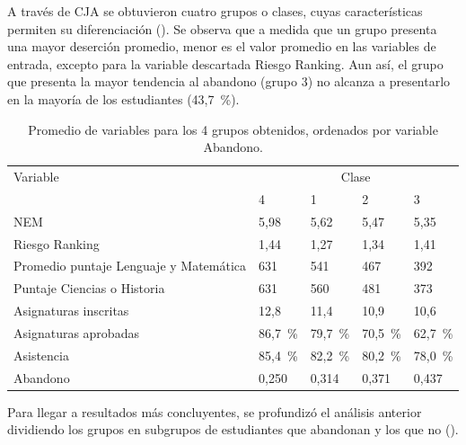 \documentclass[portuguese]{textolivre}
\begin{document}
A través de CJA se obtuvieron cuatro grupos o clases, cuyas características permiten su diferenciación (). Se observa que a medida que un grupo presenta una mayor deserción promedio, menor es el valor promedio en las variables de entrada, excepto para la variable descartada Riesgo Ranking. Aun así, el grupo que presenta la mayor tendencia al abandono (grupo 3) no alcanza a presentarlo en la mayoría de los estudiantes (43,7~\%).

\begin{table}[htbp]
    \caption{Promedio de variables para los 4 grupos obtenidos, ordenados por variable Abandono.}
    \label{Tabla 5}
    \centering
    \begin{tabular}{lllll}
    \toprule
    Variable &
    \multicolumn{4}{c}{Clase}\\
    & 4 & 1 & 2 & 3\\
    \midrule
    NEM & 5,98 & 5,62 & 5,47 & 5,35\\
    Riesgo Ranking & 1,44 & 1,27 & 1,34 & 1,41\\
    Promedio puntaje Lenguaje y Matemática & 631 & 541 & 467 & 392\\
    Puntaje Ciencias o Historia & 631 & 560 & 481 & 373\\
    Asignaturas inscritas & 12,8 & 11,4 & 10,9 & 10,6\\
    Asignaturas aprobadas & 86,7~\% & 79,7~\% & 70,5~\% & 62,7~\%\\
    Asistencia & 85,4~\% & 82,2~\% & 80,2~\% & 78,0~\%\\
    Abandono & 0,250 & 0,314 & 0,371 & 0,437\\
    \bottomrule
    \end{tabular}
\end{table}

Para llegar a resultados más concluyentes, se profundizó el análisis anterior dividiendo los grupos en subgrupos de estudiantes que abandonan y los que no ().
\end{document}
